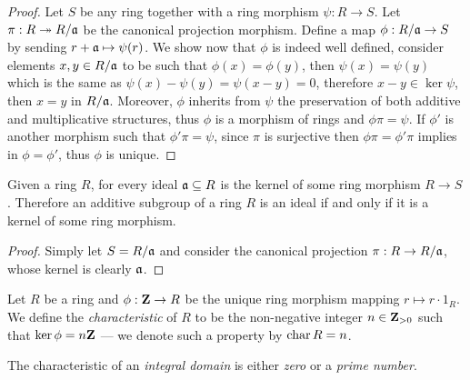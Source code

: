 \begin{proof}
    Let \(S\) be any ring together with a ring morphism \(\psi: R \to S\). Let
    \(\pi: R \twoheadrightarrow R/\mathfrak{a}\) be the canonical projection morphism. Define a map
    \(\phi: R/\mathfrak{a} \to S\) by sending \(r + \mathfrak{a} \mapsto \psi(r)\). We
    show now that \(\phi\) is indeed well defined, consider elements
    \(x, y \in R/\mathfrak{a}\) to be such that \(\phi(x) = \phi(y)\), then
    \(\psi(x) = \psi(y)\) which is the same as
    \(\psi(x) - \psi(y) = \psi(x - y) = 0\), therefore \(x - y \in \ker \psi\), then
    \(x = y\) in \(R/\mathfrak{a}\). Moreover, \(\phi\) inherits from \(\psi\) the
    preservation of both additive and multiplicative structures, thus \(\phi\) is a
    morphism of rings and \(\phi \pi = \psi\). If \(\phi'\) is another morphism such
    that \(\phi' \pi = \psi\), since \(\pi\) is surjective then \(\phi \pi = \phi'
    \pi\) implies in \(\phi = \phi'\), thus \(\phi\) is unique.
\end{proof}

\begin{corollary}
    \label{cor:ideal-is-kernel}
    Given a ring \(R\), for every ideal \(\mathfrak{a} \subseteq R\) is the kernel of
    some ring morphism \(R \to S\). Therefore an additive subgroup of a ring \(R\)
    is an ideal if and only if it is a kernel of some ring morphism.
\end{corollary}

\begin{proof}
    Simply let \(S = R/\mathfrak{a}\) and consider the canonical projection \(\pi: R
    \to R/\mathfrak{a}\), whose kernel is clearly \(\mathfrak{a}\).
\end{proof}

\begin{definition}[Characteristic]
    \label{def:ring-characteristic}
    Let \(R\) be a ring and \(\phi: \mathbf{Z} \to R\) be the unique ring morphism
    mapping \(r \mapsto r \cdot 1_R\). We define the \emph{characteristic} of \(R\)
    to be the non-negative integer \(n \in \mathbf{Z}_{> 0}\) such that \(\ker \phi = n \mathbf{Z}\)
    --- we denote such a property by \(\operatorname{char} R = n\).
\end{definition}

\begin{proposition}
    \label{prop:char-integral-domain-is-0-or-p}
    The characteristic of an \emph{integral domain} is either \emph{zero} or a
    \emph{prime number}.
\end{proposition}

